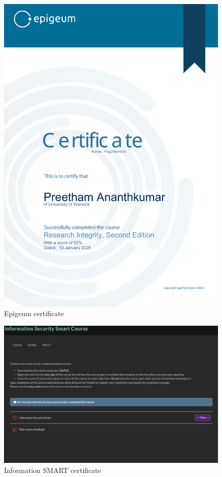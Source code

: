 \begin{figure}[htbp]
    \centering
    \includegraphics[width=1\textwidth]{images/epigeum-certificate.png}
    \caption{Epigeum certificate}
\end{figure}

\begin{figure}[htbp]
    \centering
    \includegraphics[width=1\textwidth]{images/information-security-smart-certificate.png}
    \caption{Information SMART certificate}
\end{figure}
